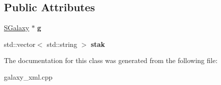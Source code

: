 \subsection*{Public Attributes}
\begin{DoxyCompactItemize}
\item 
\hyperlink{classGalaxyXML_1_1SGalaxy}{S\+Galaxy} $\ast$ {\bfseries g}\hypertarget{classGalaxyXML_1_1XML_a9b1e9a9221f557a9d463c345f5d629b1}{}\label{classGalaxyXML_1_1XML_a9b1e9a9221f557a9d463c345f5d629b1}

\item 
std\+::vector$<$ std\+::string $>$ {\bfseries stak}\hypertarget{classGalaxyXML_1_1XML_ac89b8135aeaf8c95c0f6bfc5cf07f136}{}\label{classGalaxyXML_1_1XML_ac89b8135aeaf8c95c0f6bfc5cf07f136}

\end{DoxyCompactItemize}


The documentation for this class was generated from the following file\+:\begin{DoxyCompactItemize}
\item 
galaxy\+\_\+xml.\+cpp\end{DoxyCompactItemize}
